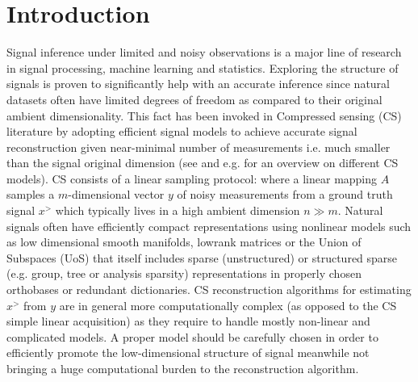 \section{Introduction}
Signal inference under limited and noisy observations is a major line of research in signal processing, machine learning and statistics. Exploring the structure of signals is proven to significantly help with an accurate inference since natural datasets often have limited degrees of freedom as compared to their original ambient dimensionality. This fact has been invoked in Compressed sensing (CS)  literature by adopting efficient signal models to achieve accurate signal reconstruction given near-minimal number of measurements i.e. much smaller than the signal original dimension (see \cite{DonohoCS, CRT:CS,Tropp:SOMP1,Candes:EMC,BW:manifold,modelbasedCS} and e.g. \cite{RichCSreview} for an overview on different CS models).
CS consists of a linear sampling protocol:
where a linear mapping $A$ samples a $m$-dimensional vector $y$ of noisy measurements from a ground truth signal $x^\gt$ which typically lives in a high ambient dimension $n\gg m$. Natural signals often have efficiently compact representations using nonlinear models such as low dimensional smooth manifolds, lowrank matrices or the Union of Subspaces (UoS) that itself includes sparse (unstructured) or structured sparse (e.g. group, tree or analysis sparsity) representations in properly chosen orthobases or redundant dictionaries\nref.
CS reconstruction algorithms for estimating $x^\gt$ from $y$ are in general more computationally complex (as opposed to the CS simple linear acquisition) as they require to handle  mostly non-linear and complicated models. %
 A proper model should be carefully chosen in order to efficiently promote the low-dimensional structure of signal meanwhile not bringing a huge computational burden to the reconstruction algorithm.

